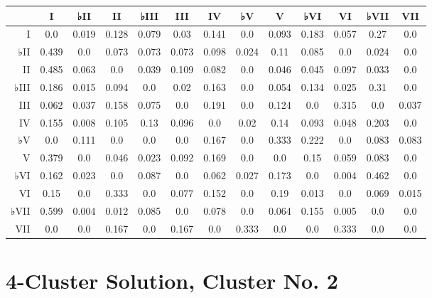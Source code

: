 \begin{table}[htbp]
\begin{minipage}{\linewidth}
\setlength{\tymax}{0.5\linewidth}
\centering
\small
\begin{tabulary}{\textwidth}{@{}RCCCCCCCCCCCC@{}} \toprule
&I&♭II&II&♭III&III&IV&♭V&V&♭VI&VI&♭VII&VII\\
\midrule
I&0.0&0.019&0.128&0.079&0.03&0.141&0.0&0.093&0.183&0.057&0.27&0.0\\
♭II&0.439&0.0&0.073&0.073&0.073&0.098&0.024&0.11&0.085&0.0&0.024&0.0\\
II&0.485&0.063&0.0&0.039&0.109&0.082&0.0&0.046&0.045&0.097&0.033&0.0\\
♭III&0.186&0.015&0.094&0.0&0.02&0.163&0.0&0.054&0.134&0.025&0.31&0.0\\
III&0.062&0.037&0.158&0.075&0.0&0.191&0.0&0.124&0.0&0.315&0.0&0.037\\
IV&0.155&0.008&0.105&0.13&0.096&0.0&0.02&0.14&0.093&0.048&0.203&0.0\\
♭V&0.0&0.111&0.0&0.0&0.0&0.167&0.0&0.333&0.222&0.0&0.083&0.083\\
V&0.379&0.0&0.046&0.023&0.092&0.169&0.0&0.0&0.15&0.059&0.083&0.0\\
♭VI&0.162&0.023&0.0&0.087&0.0&0.062&0.027&0.173&0.0&0.004&0.462&0.0\\
VI&0.15&0.0&0.333&0.0&0.077&0.152&0.0&0.19&0.013&0.0&0.069&0.015\\
♭VII&0.599&0.004&0.012&0.085&0.0&0.078&0.0&0.064&0.155&0.005&0.0&0.0\\
VII&0.0&0.0&0.167&0.0&0.167&0.0&0.333&0.0&0.0&0.333&0.0&0.0\\

\bottomrule

\end{tabulary}
\end{minipage}
\end{table}

\section{4-Cluster Solution, Cluster No. 2}
\label{4-clustersolutionclusterno.2}

